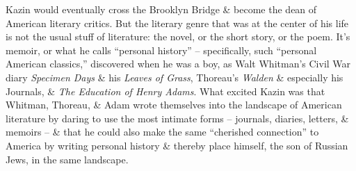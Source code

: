 \documentclass{article}
\begin{document}
Kazin would eventually cross the Brooklyn Bridge \& become the dean of American literary critics. But the literary genre that was at the center of his life is not the usual stuff of literature: the novel, or the short story, or the poem. It's memoir, or what he calls ``personal history'' -- specifically, such ``personal American classics,'' discovered when he was a boy, as Walt Whitman's Civil War diary \textit{Specimen Days} \& his \textit{Leaves of Grass}, Thoreau's \textit{Walden} \& especially his Journals, \& \textit{The Education of Henry Adams}. What excited Kazin was that Whitman, Thoreau, \& Adam wrote themselves into the landscape of American literature by daring to use the most intimate forms -- journals, diaries, letters, \& memoirs -- \& that he could also make the same ``cherished connection'' to America by writing personal history \& thereby place himself, the son of Russian Jews, in the same landscape.
\end{document}
